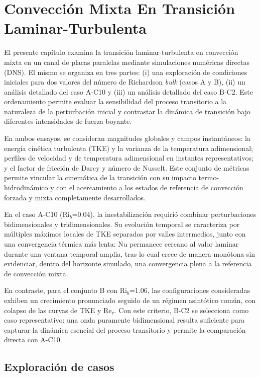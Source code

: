 \chapter{Convección Mixta En Transición Laminar-Turbulenta}

El presente capítulo examina la transición laminar-turbulenta en convección mixta en un canal de placas paralelas mediante simulaciones numéricas directas (DNS). El mismo se organiza en tres partes: (i) una exploración de condiciones iniciales para dos valores del número de Richardson \textit{bulk} (casos A y B), (ii) un análisis detallado del caso A-C10 y (iii) un análisis detallado del caso B-C2. Este ordenamiento permite evaluar la sensibilidad del proceso transitorio a la naturaleza de la perturbación inicial y contrastar la dinámica de transición bajo diferentes intensidades de fuerza boyante.

En ambos ensayos, se consideran magnitudes globales y campos instantáneos: la energía cinética turbulenta (TKE) y la varianza de la temperatura adimensional; perfiles de velocidad y de temperatura adimensional en instantes representativos; y el factor de fricción de Darcy y número de Nusselt. Este conjunto de métricas permite vincular la cinemática de la transición con su impacto termo-hidrodinámico y con el acercamiento a los estados de referencia de convección forzada y mixta completamente desarrollados.

En el caso A-C10 (Ri$_b$=0.04), la inestabilización requirió combinar perturbaciones bidimensionales y tridimensionales. Su evolución temporal se caracteriza por múltiples máximos locales de TKE separados por valles intermedios, junto con una convergencia térmica más lenta: Nu permanece cercano al valor laminar durante una ventana temporal amplia, tras lo cual crece de manera monótona sin evidenciar, dentro del horizonte simulado, una convergencia plena a la referencia de convección mixta.

En contraste, para el conjunto B con Ri$_b$=1.06, las configuraciones consideradas exhiben un crecimiento pronunciado seguido de un régimen asintótico común, con colapso de las curvas de TKE y Re$_{\tau}$. Con este criterio, B-C2 se selecciona como caso representativo: una onda puramente bidimensional resulta suficiente para capturar la dinámica esencial del proceso transitorio y permite la comparación directa con A-C10.

\newpage

\section{Exploración de casos}

